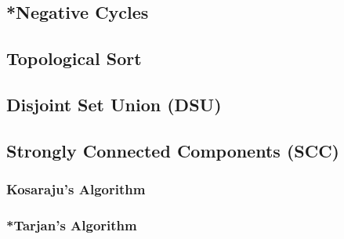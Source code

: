 \documentclass[letterpaper,landscape]{article}
\begin{document}
\subsection{*Negative Cycles}

\subsection{Topological Sort}





\subsection{Disjoint Set Union (DSU)}



\subsection{Strongly Connected Components (SCC)}

\subsubsection{Kosaraju's Algorithm}



\subsubsection{*Tarjan's Algorithm}
\end{document}
